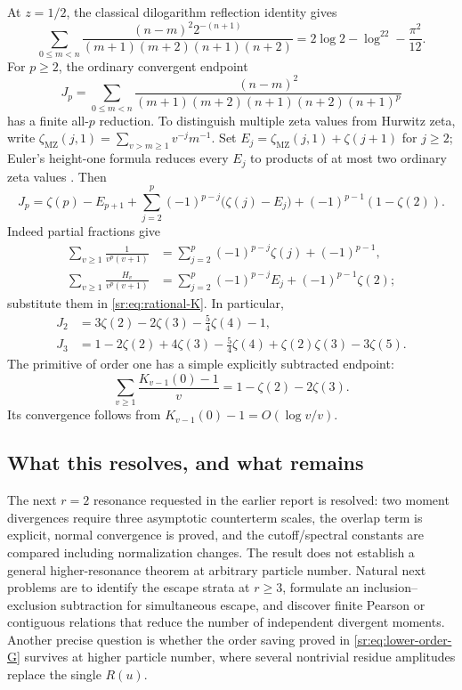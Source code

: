 \documentclass[11pt,letterpaper]{article}
\theoremstyle{definition}
\theoremstyle{remark}
\numberwithin{equation}{section}
\begin{document}
At $z=1/2$, the classical dilogarithm reflection identity
\cite[25.12.6]{dlmfpolylog} gives
\begin{equation}\label{sr:eq:half-polylog}
 \sum_{0\le m<n}\frac{(n-m)^2 2^{-(n+1)}}
 {(m+1)(m+2)(n+1)(n+2)}
 =2\log2-\log^22-\frac{\pi^2}{12}.
\end{equation}
For $p\ge2$, the ordinary convergent endpoint
\[
 J_p=\sum_{0\le m<n}\frac{(n-m)^2}
 {(m+1)(m+2)(n+1)(n+2)(n+1)^p}
\]
has a finite all-$p$ reduction. To distinguish multiple zeta values
from Hurwitz zeta, write
$\zeta_{\mathrm{MZ}}(j,1)=\sum_{v>m\ge1}v^{-j}m^{-1}$.
Set $E_j=\zeta_{\mathrm{MZ}}(j,1)+\zeta(j+1)$ for
$j\ge2$; Euler's height-one formula reduces every $E_j$ to products
of at most two ordinary zeta values \cite[Section~6]{incoming-determinantal}.
Then
\begin{equation}\label{sr:eq:allp-endpoint}
 J_p=\zeta(p)-E_{p+1}
 +\sum_{j=2}^{p}(-1)^{p-j}\bigl(\zeta(j)-E_j\bigr)
 +(-1)^{p-1}(1-\zeta(2)).
\end{equation}
Indeed partial fractions give
\begin{align*}
 \sum_{v\ge1}\frac1{v^p(v+1)}
 &=\sum_{j=2}^p(-1)^{p-j}\zeta(j)+(-1)^{p-1},\\
 \sum_{v\ge1}\frac{H_v}{v^p(v+1)}
 &=\sum_{j=2}^p(-1)^{p-j}E_j+(-1)^{p-1}\zeta(2);
\end{align*}
substitute them in \eqref{sr:eq:rational-K}. In particular,
\begin{align}
 J_2&=3\zeta(2)-2\zeta(3)-\tfrac54\zeta(4)-1,\label{sr:eq:J2}\\
 J_3&=1-2\zeta(2)+4\zeta(3)-\tfrac54\zeta(4)
       +\zeta(2)\zeta(3)-3\zeta(5).
 \label{sr:eq:J3}
\end{align}
The primitive of order one has a simple explicitly subtracted endpoint:
\begin{equation}\label{sr:eq:subtracted-J1}
 \sum_{v\ge1}\frac{K_{v-1}(0)-1}{v}
 =1-\zeta(2)-2\zeta(3).
\end{equation}
Its convergence follows from $K_{v-1}(0)-1=O(\log v/v)$.

\subsection{What this resolves, and what remains}
The next $r=2$ resonance requested in the earlier report is resolved:
two moment divergences require three asymptotic counterterm scales,
the overlap term is explicit, normal convergence is proved, and the
cutoff/spectral constants are compared including normalization changes.
The result does not establish a general higher-resonance theorem at
arbitrary particle number. Natural next problems are to identify the
escape strata at $r\ge3$, formulate an inclusion--exclusion subtraction
for simultaneous escape, and discover finite Pearson or contiguous
relations that reduce the number of independent divergent moments.
Another precise question is whether the order saving proved in
\eqref{sr:eq:lower-order-G} survives at higher particle number, where
several nontrivial residue amplitudes replace the single $R(u)$.
\end{document}

